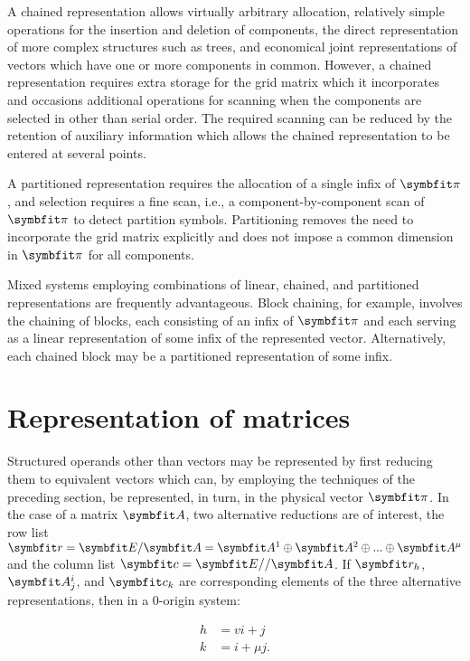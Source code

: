 \par A chained representation allows virtually arbitrary allocation, relatively simple operations for the insertion and deletion of components, the direct representation of more complex structures such as trees, and economical joint representations of vectors which have one or more components in common. However, a chained representation requires extra storage for the grid matrix which it incorporates and occasions additional operations for scanning when the components are selected in other than serial order. The required scanning can be reduced by the retention of auxiliary information which allows the chained representation to be entered at several points.

\par A partitioned representation requires the allocation of a single infix of $\vect{\pi}$, and selection requires a fine scan, i.e., a component-by-component scan of $\vect{\pi}$ to detect partition symbols. Partitioning removes the need to incorporate the grid matrix explicitly and does not impose a common dimension in $\vect{\pi}$ for all components.

\par Mixed systems employing combinations of linear, chained, and partitioned representations are frequently advantageous. Block chaining, for example, involves the chaining of blocks, each consisting of an infix of $\vect{\pi}$ and each serving as a linear representation of some infix of the represented vector. Alternatively, each chained block may be a partitioned representation of some infix.

\section{Representation of matrices}

\par Structured operands other than vectors may be represented by first reducing them to equivalent vectors which can, by employing the techniques of the preceding section, be represented, in turn, in the physical vector $\vect{\pi}$. In the case of a matrix $\mat{A}$, two alternative reductions are of interest, the row list $\vect{r} = \mat{E}/\mat{A} = \mat{A}^1 \oplus \mat{A}^2 \oplus ... \oplus \mat{A}^{\mu}$ and the column list $\vect{c} = \mat{E}//\mat{A}$. If $\vect{r}_h$, $\mat{A}_j^i$, and $\vect{c}_k$ are corresponding elements of the three alternative representations, then in a 0-origin system:

\begin{align*}
  h &= vi + j \\
  k &= i + \mu j.
\end{align*}

